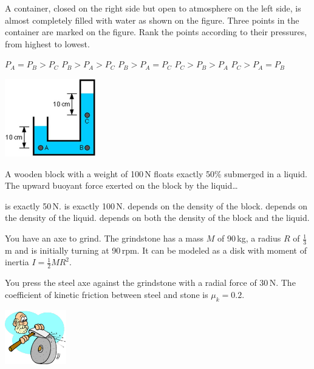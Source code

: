 \documentclass[letterpaper,addpoints,answers]{exam}
\begin{document}
\begin{questions}

\printanswers


\begin{question}[5]
\begin{multicols}{2}
A container, closed on the right side but open to atmosphere on the left side, is almost completely filled with water as shown on the figure. Three points in the container are marked on the figure. Rank the points according to their pressures, from highest to lowest.
\begin{checkboxes}
 \correctchoice $P_A = P_B > P_C$
 \choice $P_B > P_A > P_C$
 \choice $P_B > P_A = P_C$
 \choice $P_C > P_B > P_A$
 \choice $P_C > P_A = P_B$
\end{checkboxes}
\begin{center}
\includegraphics[width=0.3\textwidth]{test3/container_pressure}
\end{center}
\end{multicols}
\end{question}

\begin{question}[5]
A wooden block with a weight of 100\,N floats exactly 50\% submerged in a liquid. The upward buoyant force exerted on the block by the liquid\ldots
\begin{checkboxes}
 \choice is exactly 50\,N.
 \correctchoice is exactly 100\,N.
 \choice depends on the density of the block.
 \choice depends on the density of the liquid.
 \choice depends on both the density of the block and the liquid.
\end{checkboxes}
\end{question}

\begin{question}
\begin{multicols}{2}
You have an axe to grind. The grindstone has a mass $M$ of 90\,kg, a radius $R$ of $\frac{1}{3}$\,m and is initially turning at 90\,rpm. It can be modeled as a disk with moment of inertia $I = \frac{1}{2} M R^2$.

You press the steel axe against the grindstone with a radial force of 30\,N. The coefficient of kinetic friction between steel and stone is $\mu_k = 0.2$.
\begin{center}
\includegraphics[width=0.2\textwidth]{test3/axe_to_grind}
\end{center}
\end{multicols}
\begin{parts}

\end{parts}
\end{question}
\end{questions}
\end{document}
